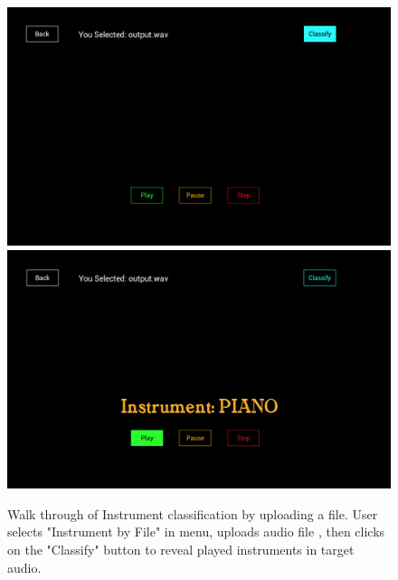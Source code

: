 \documentclass[whitelogo,12pt]{tudelft-report}
\begin{document}
\begin{figure}[!htb]
  \includegraphics[width=\linewidth]{if3}
\endminipage\hfill
{}
  \includegraphics[width=\linewidth]{if4}
\endminipage\hfill

\caption{Walk through of Instrument classification by uploading a file. User selects "Instrument by File" in menu, uploads audio file , then clicks on the "Classify" button to reveal played instruments in target audio.}
\label{fig:if}
\end{figure}
\end{document}

